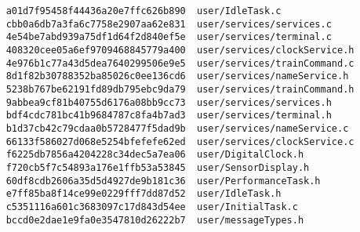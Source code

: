 \documentclass[twoside,a4paper]{refart}
\begin{document}
\begin{verbatim}
    a01d7f95458f44436a20e7ffc626b890  user/IdleTask.c
    cbb0a6db7a3fa6c7758e2907aa62e831  user/services/services.c
    4e54be7abd939a75df1d64f2d840ef5e  user/services/terminal.c
    408320cee05a6ef9709468845779a400  user/services/clockService.h
    4e976b1c77a43d5dea7640299506e9e5  user/services/trainCommand.c
    8d1f82b30788352ba85026c0ee136cd6  user/services/nameService.h
    5238b767be62191fd89db795ebc9da79  user/services/trainCommand.h
    9abbea9cf81b40755d6176a08bb9cc73  user/services/services.h
    bdf4cdc781bc41b9684787c8fa4b7ad3  user/services/terminal.h
    b1d37cb42c79cdaa0b5728477f5dad9b  user/services/nameService.c
    66133f586027d068e5254bfefefe62ed  user/services/clockService.c
    f6225db7856a4204228c34dec5a7ea06  user/DigitalClock.h
    f720cb5f7c54893a176e1ffb53a53845  user/SensorDisplay.h
    60df8cdb2606a35d5d4927de9b181c36  user/PerformanceTask.h
    e7ff85ba8f14ce99e0229fff7dd87d52  user/IdleTask.h
    c5351116a601c3683097c17d843d54ee  user/InitialTask.c
    bccd0e2dae1e9fa0e3547810d26222b7  user/messageTypes.h
\end{verbatim}
\end{document}
